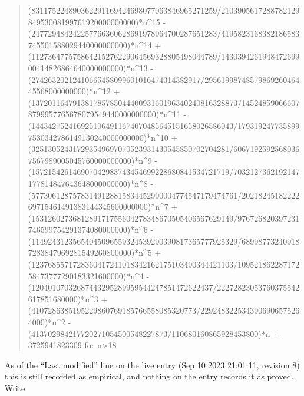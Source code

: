 \documentclass[11pt,a4paper]{article}
\theoremstyle{plain}
\theoremstyle{definition}
\begin{document}
\begin{quote}
(831175224890362291169424698077063846965271259/210390561728878212984953008199761920000000000)*n\^{}15 - (247729484242257766360628691978964700287651283/4195823168382186583745501588029440000000000)*n\^{}14 + (112736477575864215276229064569328805498044789/143039426194847269900414826864640000000000)*n\^{}13 - (27426320212410665458099601016474314382917/2956199874857986926046445568000000000)*n\^{}12 + (13720116479138178578504440093160196340240816328873/145248590666078799957765678079549440000000000)*n\^{}11 - (1443427524169251064911674070485645151658026586043/1793192477358997530342786149130240000000000)*n\^{}10 + (325130524317293549697070523931430545850702704281/60671925925680367567989005045760000000000)*n\^{}9 - (157215426146907042983743454699228680841534721719/7032127362192147177814847643648000000000)*n\^{}8 - (57730612875783149128815834452990004774547179474761/2021824518222269715461491383144345600000000)*n\^{}7 + (1531260273681289171755604278348670505406567629149/976726820397231746599754291374080000000)*n\^{}6 - (11492431235654045096559324539290390817365777925329/689987732409187283847969281549260800000)*n\^{}5 + (1237685571728360417241018342162175103490344421103/10952186228717258473777290183321600000)*n\^{}4 - (12040107032687443295289959544247851472622437/22272823053760375542617851680000)*n\^{}3 + (4107286385195229860769185766558085320773/2292483225343906906575264000)*n\^{}2 - (413702984217720271054500548227873/110680160865928453800)*n + 3725941823309 for n>18
\end{quote}
As of the ``Last modified'' line on the live entry (Sep 10 2023 21:01:11, revision 8) this is still
recorded as empirical, and nothing on the entry records it as proved. Write
\end{document}
